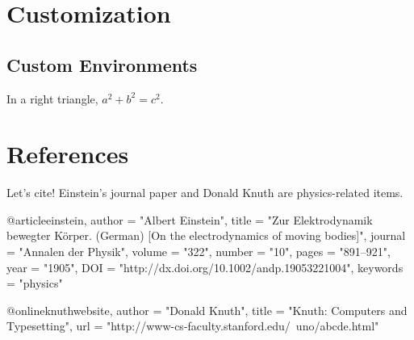 \documentclass[12pt,a4paper]{article}
\begin{document}
\section{Customization}

\subsection{Custom Environments}
\newenvironment{theorem}[1][]{
  \begin{tcolorbox}[colback=blue!5,colframe=blue!70!black,title=Theorem #1]
}{
  \end{tcolorbox}
}

\begin{theorem}[Pythagoras]
In a right triangle, $a^2 + b^2 = c^2$.
\end{theorem}

\section{References}
Let's cite! Einstein's journal paper \cite{einstein} and Donald Knuth \cite{knuth} are physics-related items. 

\printbibliography %
\printbibliography

@article{einstein,
    author = "Albert Einstein",
    title = "{Zur Elektrodynamik bewegter K{\"o}rper}. ({German})
    [{On} the electrodynamics of moving bodies]",
    journal = "Annalen der Physik",
    volume = "322",
    number = "10",
    pages = "891--921",
    year = "1905",
    DOI = "http://dx.doi.org/10.1002/andp.19053221004",
    keywords = "physics"
}

@online{knuthwebsite,
    author = "Donald Knuth",
    title = "Knuth: Computers and Typesetting",
    url  = "http://www-cs-faculty.stanford.edu/~uno/abcde.html"
}


\end{document}
